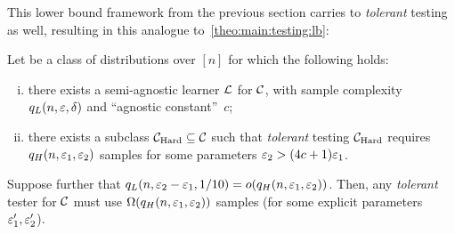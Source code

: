 This lower bound framework from the previous section carries to \emph{tolerant} testing as well, resulting in this analogue to~\cref{theo:main:testing:lb}:
\begin{theorem}\label{theo:main:testing:tol:lb}
Let \class be a class of distributions over $[n]$ for which the following holds:
\begin{enumerate}[(i)]
  \item there exists a semi-agnostic learner $\mathcal{L}$ for $\mathcal{C}$, with sample complexity $q_L(n,\varepsilon, \delta)$ and ``agnostic constant''~$c$;
  \item there exists a subclass $\mathcal{C}_{\rm Hard}\subseteq\mathcal{C}$ such that \emph{tolerant} testing $\mathcal{C}_{\rm Hard}$ requires $q_H(n,\varepsilon_1,\varepsilon_2)$ samples for some parameters $\varepsilon_2 > (4c+1)\varepsilon_1$.
\end{enumerate}
Suppose further that $q_L(n,\eps_2-\eps_1, 1/10)=\littleO{q_H(n,\eps_1,\eps_2)}$. Then, any \emph{tolerant} tester for $\mathcal{C}$ must use $\bigOmega{q_H(n,\eps_1,\eps_2)}$ samples (for some explicit parameters $\varepsilon^\prime_1,\varepsilon^\prime_2$).
\end{theorem}
